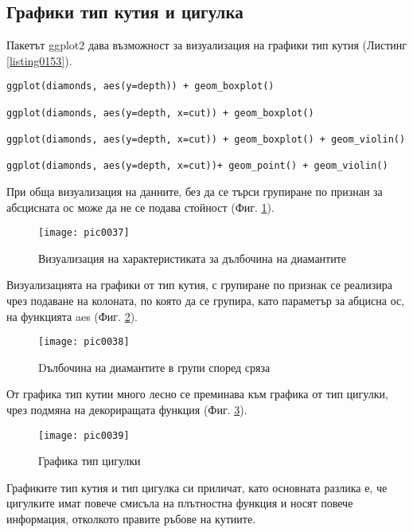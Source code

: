 \subsection{Графики тип кутия и цигулка}

Пакетът ggplot2 дава възможност за визуализация на графики тип кутия (Листинг \ref{listing0153}).

\begin{lstlisting}[caption=Визуализация тип кутия, label=listing0153]
ggplot(diamonds, aes(y=depth)) + geom_boxplot()

ggplot(diamonds, aes(y=depth, x=cut)) + geom_boxplot()

ggplot(diamonds, aes(y=depth, x=cut)) + geom_boxplot() + geom_violin()

ggplot(diamonds, aes(y=depth, x=cut))+ geom_point() + geom_violin()
\end{lstlisting}

При обща визуализация на данните, без да се търси групиране по признан за абсцисната ос може да не се подава стойност (Фиг. \ref{figure0037}). 

\begin{figure}[h!]
  \centering
  \texttt{[image: pic0037]}
  \caption{Визуализация на характеристиката за дълбочина на диамантите}
\label{figure0037}
\end{figure}
\FloatBarrier

Визуализацията на графики от тип кутия, с групиране по признак се реализира чрез подаване на колоната, по която да се групира, като параметър за абцисна ос, на функцията aes (Фиг. \ref{figure0038}).

\begin{figure}[h!]
  \centering
  \texttt{[image: pic0038]}
  \caption{Dълбочина на диамантите в групи според сряза}
\label{figure0038}
\end{figure}
\FloatBarrier

От графика тип кутии много лесно се преминава към графика от тип цигулки, чрез подмяна на декориращата функция (Фиг. \ref{figure0039}).

\begin{figure}[h!]
  \centering
  \texttt{[image: pic0039]}
  \caption{Графика тип цигулки}
\label{figure0039}
\end{figure}
\FloatBarrier

Графиките тип кутия и тип цигулка си приличат, като основната разлика е, че цигулките имат повече смисъла на плътностна функция и носят повече информация, отколкото правите ръбове на кутиите. 

